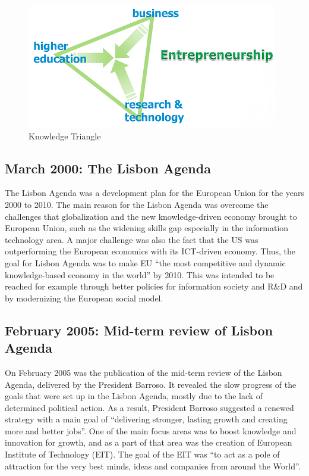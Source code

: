\documentclass[11pt,a4paper,oneside,twocolumn]{IEEEtran}
\begin{document}
\begin{figure}[!h]
    \centering
    \includegraphics[width=0.8\linewidth]{picture/Knowledge_Triangle.png}
    \caption{Knowledge Triangle}\label{fig:kt}
\end{figure}

\subsection{March 2000: The Lisbon Agenda}
The Lisbon Agenda was a development plan for the European Union for the years 2000 to 2010. The main reason for the Lisbon Agenda was overcome the challenges that globalization and the new knowledge-driven economy brought to European Union, such as the widening skills gap especially in the information technology area\cite{3_1}. A major challenge was also the fact that the US was outperforming the European economics with its ICT-driven economy\cite{3_1}. Thus, the goal for Lisbon Agenda was to make EU “the most competitive and dynamic knowledge-based economy in the world” by 2010\cite{3_1}. This was intended to be reached for example through better policies for information society and R\&D and by modernizing the European social model\cite{3_1}.

\subsection{February 2005: Mid-term review of Lisbon Agenda}
On February 2005 was the publication of the mid-term review of the Lisbon Agenda, delivered by the President Barroso.
It revealed the slow progress of the goals that were set up in the Lisbon Agenda, mostly due to the lack of determined political action\cite{3_2}.
As a result, President Barroso suggested a renewed strategy with a main goal of ``delivering stronger, lasting growth and creating more and better jobs''\cite{3_3}.
One of the main focus areas was to boost knowledge and innovation for growth, and as a part of that area was the creation of European Institute of Technology (EIT)\cite{3_3}.
The goal of the EIT was ``to act as a pole of attraction for the very best minds, ideas and companies from around the World''\cite{3_3}.
\end{document}

